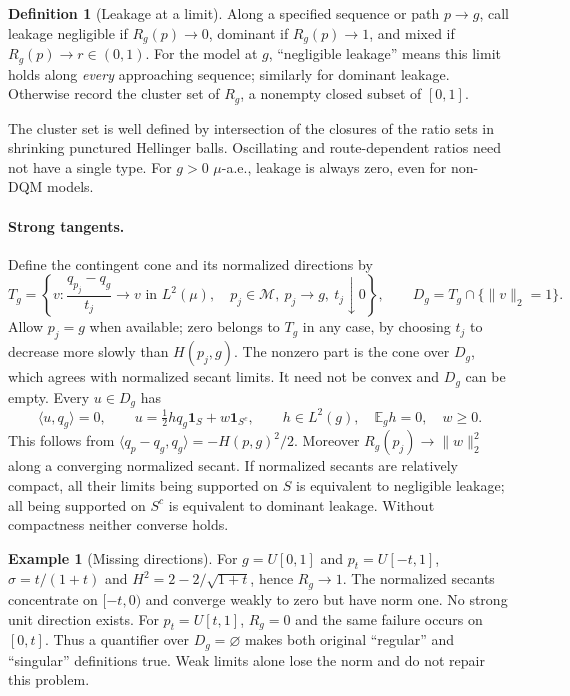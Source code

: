 \documentclass[11pt]{article}
\newcommand{\E}{\mathbb E}
\newcommand{\cM}{\mathcal M}
\theoremstyle{definition}
\newtheorem{definition}{Definition}
\newtheorem{example}{Example}
\theoremstyle{remark}
\begin{document}
\begin{definition}[Leakage at a limit]
Along a specified sequence or path $p\to g$, call leakage negligible if
$R_g(p)\to0$, dominant if $R_g(p)\to1$, and mixed if $R_g(p)\to r\in(0,1)$.
For the model at $g$, ``negligible leakage'' means this limit holds along
\emph{every} approaching sequence; similarly for dominant leakage. Otherwise
record the cluster set of $R_g$, a nonempty closed subset of $[0,1]$.
\end{definition}

The cluster set is well defined by intersection of the closures of the ratio
sets in shrinking punctured Hellinger balls. Oscillating and route-dependent
ratios need not have a single type. For $g>0$ $\mu$-a.e., leakage is always
zero, even for non-DQM models.

\paragraph{Strong tangents.}
Define the contingent cone and its normalized directions by
\[
 T_g=\left\{v:\frac{q_{p_j}-q_g}{t_j}\longrightarrow v\text{ in }L^2(\mu),\quad
       p_j\in\cM,\ p_j\to g,\ t_j\downarrow0\right\},\qquad
 D_g=T_g\cap\{\|v\|_2=1\}.
\]
Allow $p_j=g$ when available; zero belongs to $T_g$ in any case, by choosing
$t_j$ to decrease more slowly than $H(p_j,g)$. The nonzero part is the cone
over $D_g$, which agrees with normalized secant limits. It need not be
convex and $D_g$ can be empty. Every $u\in D_g$ has
\[
 \langle u,q_g\rangle=0,\qquad
 u=\tfrac12h q_g\mathbf1_S+w\mathbf1_{S^c},\qquad
 h\in L^2(g),\quad \E_g h=0,\quad w\ge0.
\]
This follows from $\langle q_p-q_g,q_g\rangle=-H(p,g)^2/2$.
Moreover $R_g(p_j)\to\|w\|_2^2$ along a converging normalized secant.
If normalized secants are relatively compact, all their limits being supported
on $S$ is equivalent to negligible leakage; all being supported on $S^c$ is
equivalent to dominant leakage. Without compactness neither converse holds.

\begin{example}[Missing directions]
For $g=U[0,1]$ and $p_t=U[-t,1]$, $\sigma=t/(1+t)$ and
$H^2=2-2/\sqrt{1+t}$, hence $R_g\to1$. The normalized secants concentrate
on $[-t,0)$ and converge weakly to zero but have norm one. No strong unit
direction exists. For $p_t=U[t,1]$, $R_g=0$ and the same failure occurs on
$[0,t]$. Thus a quantifier over $D_g=\varnothing$ makes both original
``regular'' and ``singular'' definitions true. Weak limits alone lose the
norm and do not repair this problem.
\end{example}
\end{document}
